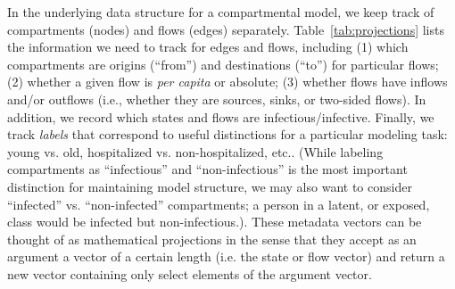 In the underlying data structure for a compartmental model, we keep track of compartments (nodes) and flows (edges) separately. Table~\ref{tab:projections} lists the information we need to track for edges and flows, including (1) which compartments are origins (``from'') and destinations (``to'') for particular flows; (2) whether a given flow is \emph{per capita} or absolute; (3) whether flows have inflows and/or outflows (i.e., whether they are sources, sinks, or two-sided flows). In addition, we record which states and flows are infectious/infective. Finally, we track \emph{labels} that correspond to useful distinctions for a particular modeling task: young vs. old, hospitalized vs. non-hospitalized, etc.. (While labeling compartments as ``infectious'' and ``non-infectious'' is the most important distinction for maintaining model structure, we may also want to consider ``infected'' vs. ``non-infected'' compartments; a person in a latent, or exposed, class would be infected but non-infectious.). These metadata vectors can be thought of as mathematical projections in the sense that they accept as an argument a vector of a certain length (i.e. the state or flow vector) and return a new vector containing only select elements of the argument vector. 

